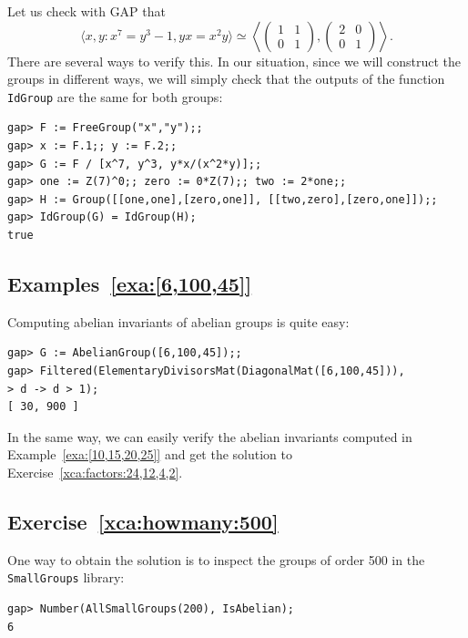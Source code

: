 Let us check with GAP that
\[
\langle x,y:x^7=y^3-1,yx=x^2y\rangle\simeq\left\langle
\begin{pmatrix}
    1&1\\
    0&1
\end{pmatrix},
\begin{pmatrix}
    2&0\\
    0&1
\end{pmatrix}\right\rangle.
\]
There are several ways to verify this. In our situation, since we will construct
the groups in different ways, we will simply check
that the outputs of the function \lstinline{IdGroup}
are the same for both groups:
\begin{lstlisting}
gap> F := FreeGroup("x","y");;
gap> x := F.1;; y := F.2;;
gap> G := F / [x^7, y^3, y*x/(x^2*y)];;
gap> one := Z(7)^0;; zero := 0*Z(7);; two := 2*one;;
gap> H := Group([[one,one],[zero,one]], [[two,zero],[zero,one]]);;
gap> IdGroup(G) = IdGroup(H);
true
\end{lstlisting}


\subsection*{Examples~\ref{exa:[6,100,45]}}

Computing abelian invariants of abelian groups is quite easy:
\begin{lstlisting}
gap> G := AbelianGroup([6,100,45]);;
gap> Filtered(ElementaryDivisorsMat(DiagonalMat([6,100,45])),
> d -> d > 1);
[ 30, 900 ]
\end{lstlisting}

In the same way, we can easily verify the abelian invariants computed in
Example~\ref{exa:[10,15,20,25]} and get the
solution to Exercise~\ref{xca:factors:24,12,4,2}.

\subsection*{Exercise~\ref{xca:howmany:500}}

One way to obtain the solution is to inspect the groups of order 500 in the
\lstinline{SmallGroups} library:
\begin{lstlisting}
gap> Number(AllSmallGroups(200), IsAbelian);
6
\end{lstlisting}

